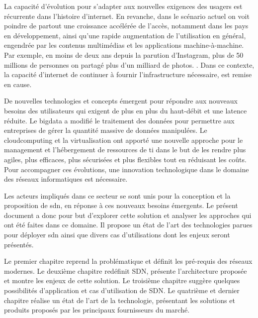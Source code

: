 \par
La capacité d'évolution pour s'adapter aux nouvelles exigences des usagers est récurrente dans l'histoire d'internet. 
En revanche, dans le scénario actuel on voit poindre de partout une croissance accélérée de l'accès, notamment dans les pays en développement, ainsi qu'une rapide augmentation de l'utilisation en général, engendrée par les contenus multimédias et les applications machine-à-machine. Par exemple, en moins de deux ans depuis la parution d'Instagram, plus de 50 millions de personnes on partagé plus d'un milliard de photos. \cite{deuxAnsInstagram}.
Dans ce contexte, la capacité d'internet de continuer à fournir l'infrastructure nécessaire, est remise en cause. \cite{InternetSustainGrowthIntro}
\par
De nouvelles technologies et concepts émergent pour répondre aux nouveaux besoins des utilisateurs qui exigent de plus en plus du haut-débit et une latence réduite. Le \gls{bigdata} a modifié le traitement des données pour permettre aux entreprises de gérer la quantité massive de données manipulées. \cite{IMBigData} Le \gls{cloudcomputing} et la \gls{virtualisation} ont apporté une nouvelle approche pour le management et l'hébergement de ressources de \gls{ti}  dans le but de les rendre plus agiles, plus efficaces, plus sécurisées et plus flexibles tout en réduisant les coûts. \cite{CloudComputingIntelVision} Pour accompagner ces évolutions, une innovation technologique dans le domaine des réseaux informatiques est nécessaire. \cite{InternetEvolutionRoleSoftwareEngineeringConclusion}
\par
Les acteurs impliqués dans ce secteur se sont unis pour la conception et la proposition de \gls{sdn}, en réponse à ces nouveaux besoins émergents. 
Le présent document a donc pour but d'explorer cette solution et analyser les approches qui ont été faites dans ce domaine. Il propose un état de l'art des technologies parues pour déployer \gls{sdn} ainsi que divers cas d'utilisations dont les enjeux seront présentés.
\par
Le premier chapitre reprend la problématique et définit les pré-requis des réseaux modernes. Le deuxième chapitre redéfinit SDN, présente l'architecture proposée et montre les enjeux de cette solution. Le troisième chapitre suggère quelques possibilités d'application et cas d'utilisation de SDN. Le quatrième et dernier chapitre réalise un état de l'art de la technologie, présentant les solutions et produits proposés par les principaux fournisseurs du marché.


